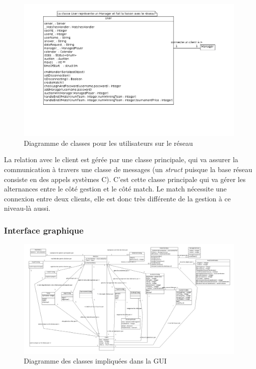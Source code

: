\documentclass[a4paper,titlepage]{scrreprt}
\begin{document}
        
          \begin{figure}[H]
          \center
          \includegraphics[scale=0.35]{uml/class/User.png}
         \caption{Diagramme de classes pour les utilisateurs sur le réseau}
         \end{figure}

          La relation avec le client est gérée par une classe principale, qui va assurer la communication
          à travers une classe de messages (un \emph{struct} puisque la base réseau consiste en des appels systèmes C).
          C'est cette classe principale qui va gérer les alternances entre le côté gestion et le côté match. Le match nécessite une connexion entre deux clients, elle est donc très différente de la gestion
          à ce niveau-là aussi.

      \subsubsection{Interface graphique}
      \begin{landscape}
      \begin{figure}[H]
          \center
          \includegraphics[scale=0.35]{uml/class/GUIClasses.png}
         \caption{Diagramme des classes impliquées dans la GUI}
      \end{figure}
      \end{landscape}
         
\end{document}
